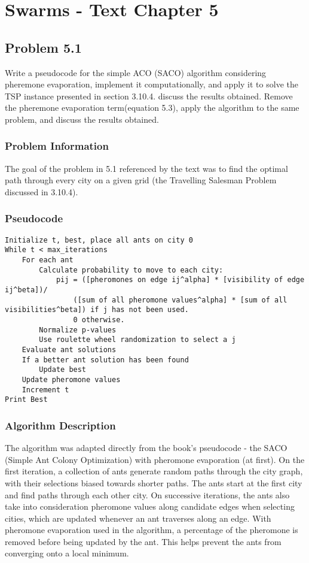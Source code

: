 
\chapter{Swarms - Text Chapter 5}

\section{Problem 5.1}

Write a pseudocode for the simple ACO (SACO) algorithm considering pheremone evaporation, implement it computationally, and apply it to solve the TSP instance presented in section 3.10.4. discuss the results obtained. Remove the pheremone evaporation term(equation 5.3), apply the algorithm to the same problem, and discuss the results obtained.

\subsection{Problem Information}

The goal of the problem in 5.1 referenced by the text was to find the optimal path through every city on a given grid (the Travelling Salesman Problem discussed in 3.10.4).

\subsection{Pseudocode}

\begin{lstlisting}
Initialize t, best, place all ants on city 0
While t < max_iterations
	For each ant
		Calculate probability to move to each city:
			pij = ([pheromones on edge ij^alpha] * [visibility of edge ij^beta])/
				([sum of all pheromone values^alpha] * [sum of all visibilities^beta]) if j has not been used.
				0 otherwise.
		Normalize p-values
		Use roulette wheel randomization to select a j
	Evaluate ant solutions
	If a better ant solution has been found
		Update best
	Update pheromone values
	Increment t
Print Best
\end{lstlisting}

\subsection{Algorithm Description}

The algorithm was adapted directly from the book's pseudocode - the SACO (Simple Ant Colony Optimization) with pheromone evaporation (at first).  On the first iteration, a collection of ants generate random paths through the city graph, with their selections biased towards shorter paths.  The ants start at the first city and find paths through each other city.  On successive iterations, the ants also take into consideration pheromone values along candidate edges when selecting cities, which are updated whenever an ant traverses along an edge.  With pheromone evaporation used in the algorithm, a percentage of the pheromone is removed before being updated by the ant.  This helps prevent the ants from converging onto a local minimum.

